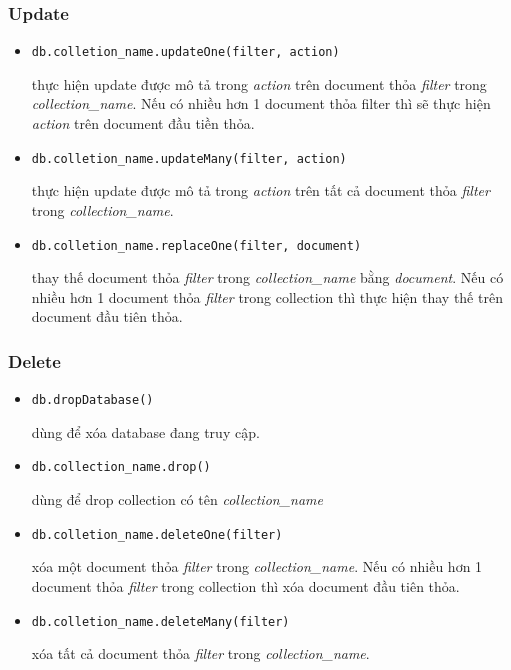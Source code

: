 \subsubsection{Update}
\begin{itemize}
\item
\begin{lstlisting}
db.colletion_name.updateOne(filter, action)
\end{lstlisting}
thực hiện update được mô tả trong \textit{action} trên document thỏa \textit{filter} trong \textit{collection\_name}. Nếu có nhiều hơn 1 document thỏa filter thì sẽ thực hiện \textit{action} trên document đầu tiền thỏa.
\item
\begin{lstlisting}
db.colletion_name.updateMany(filter, action)
\end{lstlisting}
thực hiện update được mô tả trong \textit{action} trên tất cả document thỏa \textit{filter} trong \textit{collection\_name}.
\item
\begin{lstlisting}
db.colletion_name.replaceOne(filter, document)
\end{lstlisting}
thay thế document thỏa \textit{filter} trong \textit{collection\_name} bằng \textit{document}. Nếu có nhiều hơn 1 document thỏa \textit{filter} trong collection thì thực hiện thay thế trên document đầu tiên thỏa.
\end{itemize}
\subsubsection{Delete}
\begin{itemize}
\item
\begin{lstlisting}
db.dropDatabase()
\end{lstlisting}
dùng để xóa database đang truy cập.
\item
\begin{lstlisting}
db.collection_name.drop()
\end{lstlisting}
dùng để drop collection có tên \textit{collection\_name}
\item
\begin{lstlisting}
db.colletion_name.deleteOne(filter)
\end{lstlisting}
xóa một document thỏa \textit{filter} trong \textit{collection\_name}. Nếu có nhiều hơn 1 document thỏa \textit{filter} trong collection thì xóa document đầu tiên thỏa.
\item
\begin{lstlisting}
db.colletion_name.deleteMany(filter)
\end{lstlisting}
xóa tất cả document thỏa \textit{filter} trong \textit{collection\_name}.
\end{itemize}